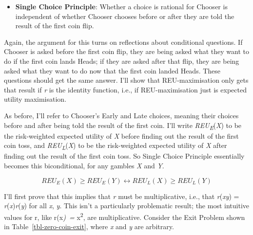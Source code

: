 \documentclass[
  12pt,
  letterpaper,
  DIV=11,
  numbers=noendperiod]{scrreprt}
\providecommand{\tightlist}{%
  \setlength{\itemsep}{0pt}\setlength{\parskip}{0pt}}\usepackage{longtable,booktabs,array}
\begin{document}
\begin{itemize}
\tightlist
\item
  \textbf{Single Choice Principle}: Whether a choice is rational for
  Chooser is independent of whether Chooser chooses before or after they
  are told the result of the first coin flip.
\end{itemize}

Again, the argument for this turns on reflections about conditional
questions. If Chooser is asked before the first coin flip, they are
being asked what they want to do if the first coin lands Heads; if they
are asked after that flip, they are being asked what they want to do now
that the first coin landed Heads. These questions should get the same
answer. I'll show that REU-maximisation only gets that result if
\emph{r} is the identity function, i.e., if REU-maximisation just is
expected utility maximisation.

As before, I'll refer to Chooser's Early and Late choices, meaning their
choices before and after being told the result of the first coin. I'll
write \emph{REU\textsubscript{E}}(\emph{X}) to be the risk-weighted
expected utility of \emph{X} before finding out the result of the first
coin toss, and \emph{REU\textsubscript{L}}(\emph{X}) to be the
risk-weighted expected utility of \emph{X} after finding out the result
of the first coin toss. So Single Choice Principle essentially becomes
this biconditional, for any gambles \emph{X} and \emph{Y}.

\[
REU_E(X) \geq REU_E(Y) \leftrightarrow REU_L(X) \geq REU_L(Y)
\]

I'll first prove that this implies that \emph{r} must be multiplicative,
i.e., that \emph{r}(\emph{xy}) = \emph{r}(\emph{x})\emph{r}(\emph{y})
for all \emph{x}, \emph{y}. This isn't a particularly problematic
result; the most intuitive values for r, like r(x\emph{)~=}
x\textsuperscript{2}, are multiplicative. Consider the Exit Problem
shown in Table~\ref{tbl-zero-coin-exit}, where \emph{x} and \emph{y} are
arbitrary.
\end{document}
